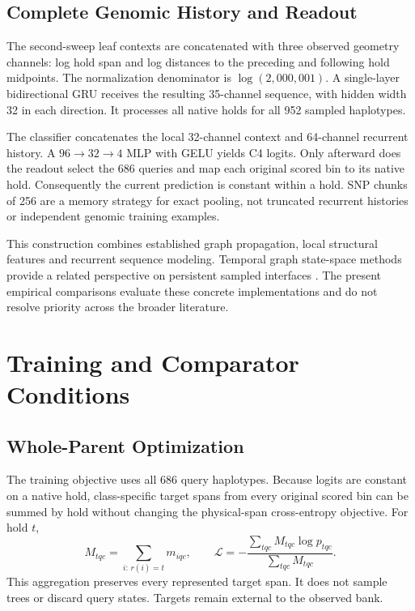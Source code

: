 \documentclass[letterpaper]{article}
\begin{document}
\subsection{Complete Genomic History and Readout}
The second-sweep leaf contexts are concatenated with three observed geometry channels: log hold span and log distances to the preceding and following hold midpoints. The normalization denominator is $\log(2{,}000{,}001)$. A single-layer bidirectional GRU receives the resulting 35-channel sequence, with hidden width 32 in each direction. It processes all native holds for all 952 sampled haplotypes.

The classifier concatenates the local 32-channel context and 64-channel recurrent history. A $96\to32\to4$ MLP with GELU yields C4 logits. Only afterward does the readout select the 686 queries and map each original scored bin to its native hold. Consequently the current prediction is constant within a hold. SNP chunks of 256 are a memory strategy for exact pooling, not truncated recurrent histories or independent genomic training examples.

This construction combines established graph propagation, local structural features and recurrent sequence modeling. Temporal graph state-space methods provide a related perspective on persistent sampled interfaces \citep{graphssm2024}. The present empirical comparisons evaluate these concrete implementations and do not resolve priority across the broader literature.

\section{Training and Comparator Conditions}
\subsection{Whole-Parent Optimization}
The training objective uses all 686 query haplotypes. Because logits are constant on a native hold, class-specific target spans from every original scored bin can be summed by hold without changing the physical-span cross-entropy objective. For hold $t$,
\begin{equation}
M_{tqc}=\sum_{i:\,r(i)=t}m_{iqc},
\qquad
\mathcal{L}=-\frac{\sum_{tqc}M_{tqc}\log p_{tqc}}{\sum_{tqc}M_{tqc}}.
\end{equation}
This aggregation preserves every represented target span. It does not sample trees or discard query states. Targets remain external to the observed bank.
\end{document}
